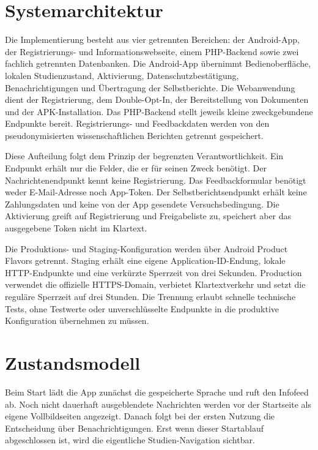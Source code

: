 
\section{Systemarchitektur}

Die Implementierung besteht aus vier getrennten Bereichen: der Android-App, der Registrierungs- und Informationswebseite, einem PHP-Backend sowie zwei fachlich getrennten Datenbanken. Die Android-App übernimmt Bedienoberfläche, lokalen Studienzustand, Aktivierung, Datenschutzbestätigung, Benachrichtigungen und Übertragung der Selbstberichte. Die Webanwendung dient der Registrierung, dem Double-Opt-In, der Bereitstellung von Dokumenten und der APK-Installation. Das PHP-Backend stellt jeweils kleine zweckgebundene Endpunkte bereit. Registrierungs- und Feedbackdaten werden von den pseudonymisierten wissenschaftlichen Berichten getrennt gespeichert.

Diese Aufteilung folgt dem Prinzip der begrenzten Verantwortlichkeit. Ein Endpunkt erhält nur die Felder, die er für seinen Zweck benötigt. Der Nachrichtenendpunkt kennt keine Registrierung. Das Feedbackformular benötigt weder E-Mail-Adresse noch App-Token. Der Selbstberichtsendpunkt erhält keine Zahlungsdaten und keine von der App gesendete Versuchsbedingung. Die Aktivierung greift auf Registrierung und Freigabeliste zu, speichert aber das ausgegebene Token nicht im Klartext.

Die Produktions- und Staging-Konfiguration werden über Android Product Flavors getrennt. Staging erhält eine eigene Application-ID-Endung, lokale HTTP-Endpunkte und eine verkürzte Sperrzeit von drei Sekunden. Production verwendet die offizielle HTTPS-Domain, verbietet Klartextverkehr und setzt die reguläre Sperrzeit auf drei Stunden. Die Trennung erlaubt schnelle technische Tests, ohne Testwerte oder unverschlüsselte Endpunkte in die produktive Konfiguration übernehmen zu müssen.

\section{Zustandsmodell}

Beim Start lädt die App zunächst die gespeicherte Sprache und ruft den Infofeed ab. Noch nicht dauerhaft ausgeblendete Nachrichten werden vor der Startseite als eigene Vollbildseiten angezeigt. Danach folgt bei der ersten Nutzung die Entscheidung über Benachrichtigungen. Erst wenn dieser Startablauf abgeschlossen ist, wird die eigentliche Studien-Navigation sichtbar.

